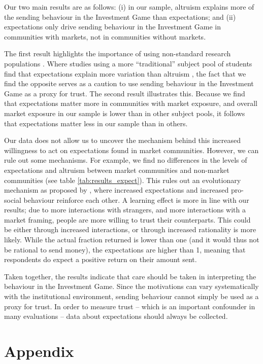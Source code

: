 Our two main results are as follows: (i) in our sample, altruism explains more of the sending behaviour in the Investment Game than expectations; and (ii) expectations only drive sending behaviour in the Investment Game in communities with markets, not in communities without markets.  

The first result highlights the importance of using non-standard research populations \citep{Henrich2010a}. Where studies using a more ``traditional'' subject pool of students find that expectations explain more variation than altruism \citep[see e.g.][]{Ashraf2006}, the fact that we find the opposite serves as a caution to use sending behaviour in the Investment Game as a proxy for trust. The second result illustrates this. Because we find that expectations matter more in communities with market exposure, and overall market exposure in our sample is lower than in other subject pools, it follows that expectations matter less in our sample than in others.

Our data does not allow us to uncover the mechanism behind this increased willingness to act on expectations found in market communities. However, we can rule out some mechanisms. For example, we find no differences in the levels of expectations and altruism between market communities and non-market communities (see table \ref{tab:results_expect}). This rules out an evolutionary mechanism as proposed by \cite{Tabellini2008}, where increased expectations and increased pro-social behaviour reinforce each other. A learning effect is more in line with our results; due to more interactions with strangers, and more interactions with a market framing, people are more willing to trust their counterparts. This could be either through increased interactions, or through increased rationality \citep[e.g.][]{List2008,Cecchi2013} is more likely. While the actual fraction returned is lower than one (and it would thus not be rational to send money), the expectations are higher than 1, meaning that respondents do expect a positive return on their amount sent.

Taken together, the results indicate that care should be taken in interpreting the behaviour in the Investment Game. Since the motivations can vary systematically with the institutional environment, sending behaviour cannot simply be used as a proxy for trust. In order to measure trust -- which is an important confounder in many evaluations -- data about expectations should always be collected.

\clearpage
\section{Appendix}
\setcounter{table}{0}
\renewcommand{\thetable}{\arabic{chapter}.A\arabic{table}}





\clearpage 







